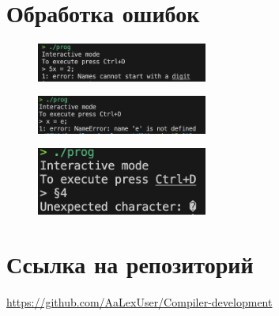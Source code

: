 \documentclass[12pt,onecolumn]{article}
\begin{document}
\section{Обработка ошибок}
\begin{figure}[H]
    \centering
    \includegraphics[width=0.5\textwidth]{image/error1.png}
\end{figure}
\begin{figure}[H]
    \centering
    \includegraphics[width=0.5\textwidth]{image/error2.png}
\end{figure}
\begin{figure}[H]
    \centering
    \includegraphics[width=0.5\textwidth]{image/error3.png}
\end{figure}
\section{Ссылка на репозиторий}
\href{https://github.com/AaLexUser/Compiler-development}{https://github.com/AaLexUser/Compiler-development}
\end{document}
